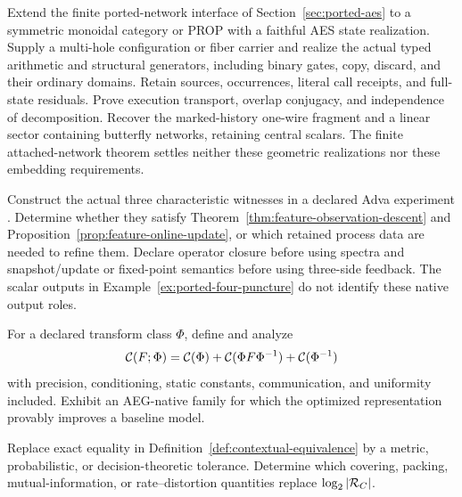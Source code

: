 \begin{problem}
\label{prob:faithful-multiwire-aeg}
Extend the finite ported-network interface of Section~\ref{sec:ported-aes} to a
symmetric monoidal category or PROP with a faithful AES state realization.
Supply a multi-hole configuration or fiber carrier and realize the actual typed
arithmetic and structural generators, including binary gates, copy, discard,
and their ordinary domains.  Retain sources, occurrences, literal call receipts,
and full-state residuals.  Prove execution transport, overlap conjugacy, and
independence of decomposition.  Recover the marked-history one-wire fragment
and a linear sector containing butterfly networks, retaining central scalars.
The finite attached-network theorem settles neither these geometric
realizations nor these embedding requirements.
\end{problem}

\begin{problem}
\label{prob:opposite-edge-features}
Construct the actual three characteristic witnesses in a declared Adva
experiment \cite{Yuan2026AdvaArithmeticCalibration}.  Determine whether they
satisfy Theorem~\ref{thm:feature-observation-descent} and
Proposition~\ref{prop:feature-online-update}, or which retained process data
are needed to refine them.  Declare operator closure before using spectra and
snapshot/update or fixed-point semantics before using three-side feedback.
The scalar outputs in Example~\ref{ex:ported-four-puncture} do not identify
these native output roles.
\end{problem}

\begin{problem}
For a declared transform class $\Phi$, define and analyze
\[
  \mathcal C(F;\Phi)
  =\mathcal C(\Phi)+\mathcal C(\Phi F\Phi^{-1})+\mathcal C(\Phi^{-1})
\]
with precision, conditioning, static constants, communication, and uniformity
included.  Exhibit an AEG-native family for which the optimized representation
provably improves a baseline model.
\end{problem}

\begin{problem}
Replace exact equality in Definition~\ref{def:contextual-equivalence} by a
metric, probabilistic, or decision-theoretic tolerance.  Determine which
covering, packing, mutual-information, or rate--distortion quantities replace
$\log_2|\mathcal R_C|$.
\end{problem}

